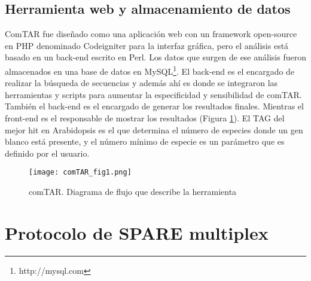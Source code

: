 \subsection{Herramienta web y almacenamiento de datos}
ComTAR fue diseñado como una aplicación web con un framework open-source en PHP denominado Codeigniter para la interfaz gráfica, pero el análisis está basado en un back-end escrito en Perl.
Los datos que surgen de ese análisis fueron almacenados en una base de datos en MySQL\footnote{http://mysql.com}.
El back-end es el encargado de realizar la búsqueda de secuencias y además ahí es donde se integraron las herramientas y scripts para aumentar la especificidad y sensibilidad de comTAR. 
También el back-end es el encargado de generar los resultados finales.
Mientras el front-end es el responsable de mostrar los resultados (Figura \ref{fig:comTAR_fig1}).
El TAG del mejor hit en Arabidopsis es el que determina el número de especies donde un gen blanco está presente, y el número mínimo de especie es un parámetro que es definido por el usuario.

\begin{figure}[htbp!] 
    \centering    
    \texttt{[image: comTAR\_fig1.png]}
    \caption[comTAR. Diagrama de flujo]{comTAR. Diagrama de flujo que describe la herramienta}
    \label{fig:comTAR_fig1}
\end{figure}


\section{Protocolo de SPARE multiplex}

